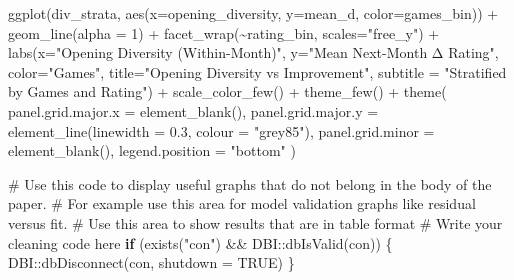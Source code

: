\documentclass[
  12pt]{article}
\newenvironment{Shaded}{\begin{snugshade}}{\end{snugshade}}
\newcommand{\AttributeTok}[1]{\textcolor[rgb]{0.40,0.45,0.13}{#1}}
\newcommand{\CommentTok}[1]{\textcolor[rgb]{0.37,0.37,0.37}{#1}}
\newcommand{\ConstantTok}[1]{\textcolor[rgb]{0.56,0.35,0.01}{#1}}
\newcommand{\ControlFlowTok}[1]{\textcolor[rgb]{0.00,0.23,0.31}{\textbf{#1}}}
\newcommand{\DecValTok}[1]{\textcolor[rgb]{0.68,0.00,0.00}{#1}}
\newcommand{\FloatTok}[1]{\textcolor[rgb]{0.68,0.00,0.00}{#1}}
\newcommand{\FunctionTok}[1]{\textcolor[rgb]{0.28,0.35,0.67}{#1}}
\newcommand{\NormalTok}[1]{\textcolor[rgb]{0.00,0.23,0.31}{#1}}
\newcommand{\SpecialCharTok}[1]{\textcolor[rgb]{0.37,0.37,0.37}{#1}}
\newcommand{\StringTok}[1]{\textcolor[rgb]{0.13,0.47,0.30}{#1}}
\begin{document}
\begin{Shaded}
\begin{Highlighting}[]
\FunctionTok{ggplot}\NormalTok{(div\_strata, }\FunctionTok{aes}\NormalTok{(}\AttributeTok{x=}\NormalTok{opening\_diversity, }\AttributeTok{y=}\NormalTok{mean\_d, }\AttributeTok{color=}\NormalTok{games\_bin)) }\SpecialCharTok{+}
  \FunctionTok{geom\_line}\NormalTok{(}\AttributeTok{alpha =} \DecValTok{1}\NormalTok{) }\SpecialCharTok{+}
  \FunctionTok{facet\_wrap}\NormalTok{(}\SpecialCharTok{\textasciitilde{}}\NormalTok{rating\_bin, }\AttributeTok{scales=}\StringTok{"free\_y"}\NormalTok{) }\SpecialCharTok{+}
  \FunctionTok{labs}\NormalTok{(}\AttributeTok{x=}\StringTok{"Opening Diversity (Within{-}Month)"}\NormalTok{, }\AttributeTok{y=}\StringTok{"Mean Next{-}Month Δ Rating"}\NormalTok{,}
       \AttributeTok{color=}\StringTok{"Games"}\NormalTok{,}
       \AttributeTok{title=}\StringTok{"Opening Diversity vs Improvement"}\NormalTok{,}
       \AttributeTok{subtitle =} \StringTok{"Stratified by Games and Rating"}\NormalTok{) }\SpecialCharTok{+}
  \FunctionTok{scale\_color\_few}\NormalTok{() }\SpecialCharTok{+}
  \FunctionTok{theme\_few}\NormalTok{() }\SpecialCharTok{+} 
  \FunctionTok{theme}\NormalTok{(}
    \AttributeTok{panel.grid.major.x =} \FunctionTok{element\_blank}\NormalTok{(),}
    \AttributeTok{panel.grid.major.y =} \FunctionTok{element\_line}\NormalTok{(}\AttributeTok{linewidth =} \FloatTok{0.3}\NormalTok{, }\AttributeTok{colour =} \StringTok{"grey85"}\NormalTok{),}
    \AttributeTok{panel.grid.minor =} \FunctionTok{element\_blank}\NormalTok{(),}
    \AttributeTok{legend.position =} \StringTok{"bottom"}
\NormalTok{  )}

\CommentTok{\# Use this code to display useful graphs that do not belong in the body of the paper.}
\CommentTok{\# For example use this area for model validation graphs like residual versus fit.}
\CommentTok{\# Use this area to show results that are in table format}
\CommentTok{\# Write your cleaning code here}
\ControlFlowTok{if}\NormalTok{ (}\FunctionTok{exists}\NormalTok{(}\StringTok{"con"}\NormalTok{) }\SpecialCharTok{\&\&}\NormalTok{ DBI}\SpecialCharTok{::}\FunctionTok{dbIsValid}\NormalTok{(con)) \{}
\NormalTok{  DBI}\SpecialCharTok{::}\FunctionTok{dbDisconnect}\NormalTok{(con, }\AttributeTok{shutdown =} \ConstantTok{TRUE}\NormalTok{)}
\NormalTok{\}}
\end{Highlighting}
\end{Shaded}



\renewcommand\refname{Cleanup (Header To-Be Removed for Final Draft)}
  
\end{document}
